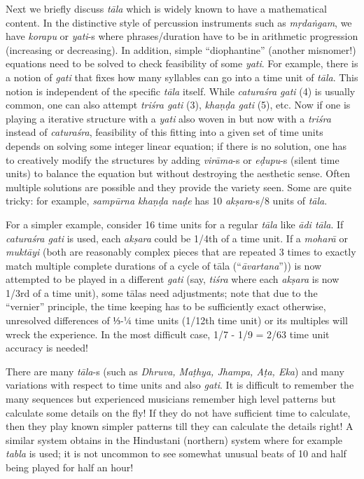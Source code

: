 Next we briefly discuss \textsl{tāla} which is widely known to have a mathematical content. In the distinctive style of percussion instruments such as \textsl{mṛdaṅgam}, we have \textsl{korapu} or \textsl{yati}-s where phrases/duration have to be in arithmetic progression (increasing or decreasing). In addition, simple “diophantine” (another misnomer!) equations need to be solved to check feasibility of some \textsl{yati}. For example, there is a notion of \textsl{gati} that fixes how many syllables can go into a time unit of \textsl{tāla}. This notion is independent of the specific \textsl{tāla} itself. While \textsl{caturaśra gati} (4) is usually common, one can also attempt \textsl{triśra gati} (3), \textsl{khaṇḍa gati} (5), etc. Now if one is playing a iterative structure with a \textsl{yati} also woven in but now with a \textsl{triśra} instead of \textsl{caturaśra}, feasibility of this fitting into a given set of time units depends on solving some integer linear equation; if there is no solution, one has to creatively modify the structures by adding \textsl{virāma}-s or \textsl{eḍupu}-s (silent time units) to balance the equation but without destroying the aesthetic sense. Often multiple solutions are possible and they provide the variety seen. Some are quite tricky: for example, \textsl{sampūrna khaṇḍa naḍe} has 10 \textsl{akṣara}-s/8 units of \textsl{tāla}.

For a simpler example, consider 16 time units for a regular \textsl{tāla} like \textsl{ādi tāla}. If \textsl{caturaśra gati} is used, each \textsl{akṣara} could be 1/4th of a time unit. If a \textsl{moharā} or \textsl{muktāyi} (both are reasonably complex pieces that are repeated 3 times to exactly match multiple complete durations of a cycle of tāla (“\textsl{āvartana}”)) is now attempted to be played in a different \textsl{gati} (say, \textsl{tiśra} where each \textsl{akṣara} is now 1/3rd of a time unit), some tālas need adjustments; note that due to the “vernier” principle, the time keeping has to be sufficiently exact otherwise, unresolved differences of ⅓-¼ time units (1/12th time unit) or its multiples will wreck the experience. In the most difficult case, 1/7 - 1/9 = 2/63 time unit accuracy is needed!

There are many \textsl{tāla}-s (such as \textsl{Dhruva, Maṭhya, Jhampa, Aṭa, Eka}) and many variations with respect to time units and also \textsl{gati}. It is difficult to remember the many sequences but experienced musicians remember high level patterns but calculate some details on the fly! If they do not have sufficient time to calculate, then they play known simpler patterns till they can calculate the details right! A similar system obtains in the Hindustani (northern) system where for example \textsl{tabla} is used; it is not uncommon to see somewhat unusual beats of 10 and half being played for half an hour! 

